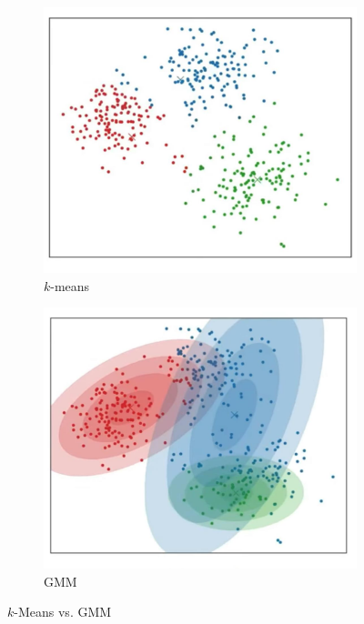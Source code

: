 \documentclass[
	number={6},
	title={Clustering}
]{cs584notes}
\begin{document}
\begin{figure}[H]
	\centering
	\begin{subfigure}{0.475\textwidth}
		\includegraphics[width=\textwidth]{figures/6/k_means}
		\caption{$k$-means}
		\label{fig:k-means}
	\end{subfigure}\hfill
	\begin{subfigure}{0.475\textwidth}
		\includegraphics[width=\textwidth]{figures/6/gmm}
		\caption{GMM}
		\label{fig:gmm}
	\end{subfigure}
	\caption{$k$-Means vs. GMM}
	\label{fig:k-means-vs-gmm}
\end{figure}
\end{document}
